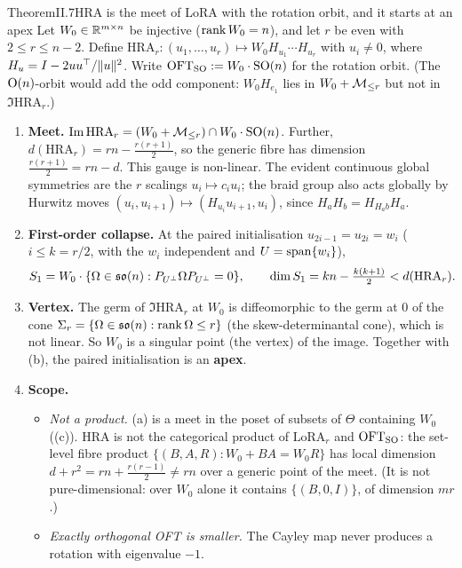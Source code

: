 \begin{restate}{Theorem}{II.7}{HRA is the meet of LoRA with the rotation orbit, and it starts at an apex}
Let $W_0\in\mathbb{R}^{m\times n}$ be injective ($\operatorname{rank} W_0=n$), and let $r$ be even with $2\le r\le n-2$. Define
$\mathrm{HRA}_r:(u_1,\dots,u_r)\mapsto W_0H_{u_1}\cdots H_{u_r}$ with $u_i\ne0$, where
$H_u=I-2uu^{\top}/\lVert u\rVert^2$. Write $\mathrm{OFT}_{\mathrm{SO}}:=W_0\cdot\mathrm{SO}(n)$ for the rotation orbit. (The $\mathrm{O}(n)$-orbit
would add the odd component: $W_0H_{e_1}$ lies in $W_0+\mathcal{M}_{\le r}$ but not in $\Im\mathrm{HRA}_r$.)
\begin{enumerate}[label=(\alph*)]
  \item \textbf{Meet.} $\operatorname{Im}\mathrm{HRA}_r=(W_0+\mathcal{M}_{\le r})\cap W_0\cdot\mathrm{SO}(n)$. Further, $d(\mathrm{HRA}_r)=rn-\tfrac{r(r+1)}2$,
    so the generic fibre has dimension $\tfrac{r(r+1)}2=rn-d$. This gauge is non-linear. The evident continuous global
    symmetries are the $r$ scalings $u_i\mapsto c_iu_i$; the braid group also acts globally by Hurwitz moves
    $(u_i,u_{i+1})\mapsto(H_{u_i}u_{i+1},u_i)$, since $H_aH_b=H_{H_ab}H_a$.
  \item \textbf{First-order collapse.} At the paired initialisation $u_{2i-1}=u_{2i}=w_i$ ($i\le k=r/2$, with the $w_i$
    independent and $U=\operatorname{span}\{w_i\}$),
    \begin{equation*}
      S_1=W_0\cdot\{\Omega\in\mathfrak{so}(n):P_{U^\perp}\Omega P_{U^\perp}=0\},\qquad\dim S_1=kn-\tfrac{k(k+1)}2<d(\mathrm{HRA}_r).
    \end{equation*}
  \item \textbf{Vertex.} The germ of $\Im\mathrm{HRA}_r$ at $W_0$ is diffeomorphic to the germ at $0$ of the cone
    $\Sigma_r=\{\Omega\in\mathfrak{so}(n):\operatorname{rank}\Omega\le r\}$ (the skew-determinantal cone), which is not linear. So $W_0$ is a
    singular point (the vertex) of the image. Together with (b), the paired initialisation is an \textbf{apex}.
  \item \textbf{Scope.}
    \begin{itemize}
      \item \emph{Not a product.} (a) is a meet in the poset of subsets of $\Theta$ containing $W_0$
        ((c)). HRA is not the
        categorical product of $\mathrm{LoRA}_r$ and $\mathrm{OFT}_{\mathrm{SO}}$: the set-level fibre product
        $\{(B,A,R):W_0+BA=W_0R\}$ has local dimension $d+r^2=rn+\tfrac{r(r-1)}2\ne rn$ over a generic point of the
        meet. (It is not pure-dimensional: over $W_0$ alone it contains $\{(B,0,I)\}$, of dimension $mr$.)
      \item \emph{Exactly orthogonal OFT is smaller.} The Cayley map never produces a rotation with eigenvalue $-1$.

\end{itemize}
\end{enumerate}
\end{restate}
